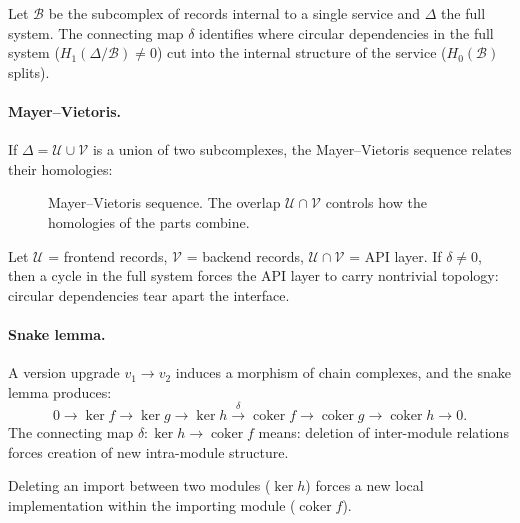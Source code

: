 \begin{example}[Microservices]
Let $\mathcal{B}$ be the subcomplex of records internal to a single service and $\Delta$ the full system. The connecting map $\delta$ identifies where circular dependencies in the full system ($H_1(\Delta/\mathcal{B}) \neq 0$) cut into the internal structure of the service ($H_0(\mathcal{B})$ splits).
\end{example}

\paragraph{Mayer--Vietoris.} If $\Delta = \mathcal{U} \cup \mathcal{V}$ is a union of two subcomplexes, the Mayer--Vietoris sequence relates their homologies:

\begin{figure}[ht]
\centering
{}
\caption{Mayer--Vietoris sequence. The overlap $\mathcal{U} \cap \mathcal{V}$ controls how the homologies of the parts combine.}
\label{fig:mayer-vietoris}
\end{figure}

\begin{example}
Let $\mathcal{U}$ = frontend records, $\mathcal{V}$ = backend records, $\mathcal{U} \cap \mathcal{V}$ = API layer. If $\delta \neq 0$, then a cycle in the full system forces the API layer to carry nontrivial topology: circular dependencies tear apart the interface.
\end{example}

\paragraph{Snake lemma.} A version upgrade $v_1 \to v_2$ induces a morphism of chain complexes, and the snake lemma produces:
\[
0 \to \ker f \to \ker g \to \ker h \xrightarrow{\delta} \operatorname{coker} f \to \operatorname{coker} g \to \operatorname{coker} h \to 0.
\]
The connecting map $\delta : \ker h \to \operatorname{coker} f$ means: deletion of inter-module relations forces creation of new intra-module structure.

\begin{example}
Deleting an import between two modules ($\ker h$) forces a new local implementation within the importing module ($\operatorname{coker} f$).
\end{example}

